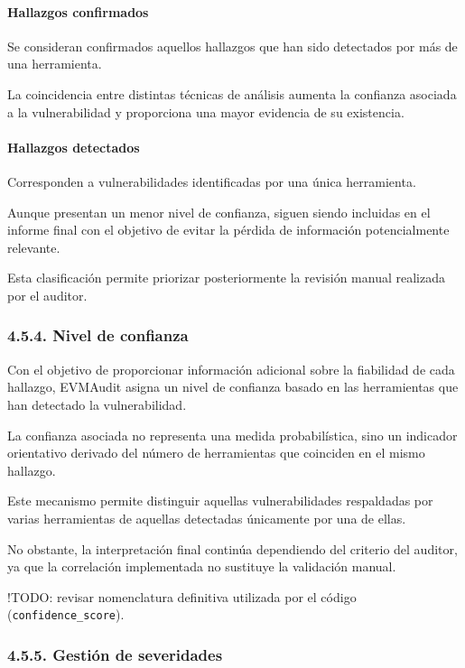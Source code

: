 \paragraph{Hallazgos confirmados}\label{hallazgos-confirmados}

Se consideran confirmados aquellos hallazgos que han sido detectados por
más de una herramienta.

La coincidencia entre distintas técnicas de análisis aumenta la
confianza asociada a la vulnerabilidad y proporciona una mayor evidencia
de su existencia.

\paragraph{Hallazgos detectados}\label{hallazgos-detectados}

Corresponden a vulnerabilidades identificadas por una única herramienta.

Aunque presentan un menor nivel de confianza, siguen siendo incluidas en
el informe final con el objetivo de evitar la pérdida de información
potencialmente relevante.

Esta clasificación permite priorizar posteriormente la revisión manual
realizada por el auditor.

\subsubsection{4.5.4. Nivel de confianza}\label{nivel-de-confianza}

Con el objetivo de proporcionar información adicional sobre la
fiabilidad de cada hallazgo, EVMAudit asigna un nivel de confianza
basado en las herramientas que han detectado la vulnerabilidad.

La confianza asociada no representa una medida probabilística, sino un
indicador orientativo derivado del número de herramientas que coinciden
en el mismo hallazgo.

Este mecanismo permite distinguir aquellas vulnerabilidades respaldadas
por varias herramientas de aquellas detectadas únicamente por una de
ellas.

No obstante, la interpretación final continúa dependiendo del criterio
del auditor, ya que la correlación implementada no sustituye la
validación manual.

!TODO: revisar nomenclatura definitiva utilizada por el código
(\texttt{confidence\_score}).

\subsubsection{4.5.5. Gestión de
severidades}\label{gestiuxf3n-de-severidades}

